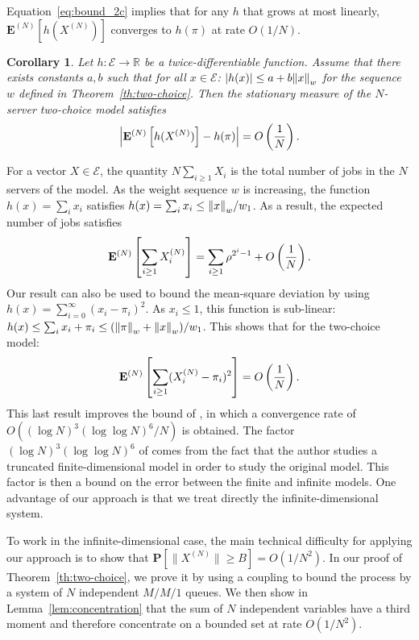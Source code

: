 \documentclass[sigconf]{acmart}
\newcommand\XN{X^{(N)}}
\newcommand\E{\mathcal{E}}
\newcommand\R{\mathbb{R}}
\newcommand\espN[1]{{\mathchoice{\bespN{#1}}{\sespN{#1}}{\sespN{#1}}{\sespN{#1}}}}
\newcommand\bespN[1]{\mathbf{E}^{(N)}\left[#1\right]}
\newcommand\sespN[1]{\mathbf{E}^{(N)}[#1]}
\newcommand\sProba[1]{\mathbf{P}[#1]}
\newcommand\norm[1]{{\mathchoice{\bnorm{#1}}{\snorm{#1}}{\snorm{#1}}{\snorm{#1}}}}
\newcommand\bnorm[1]{\left\|#1\right\|}
\newcommand\snorm[1]{\|#1\|}
\newcommand\abs[1]{\left|#1\right|}
\newcommand\p[1]{\left(#1\right)}
\newtheorem{coro}{Corollary}
\begin{document}
Equation~\eqref{eq:bound_2c} implies that for any $h$ that grows at
most linearly, $\sespN{h(\XN)}$ converges to $h(\pi)$ at rate
$O(1/N)$.
\begin{coro}
  \label{coro:two-choice}
  Let $h:\E\to\R$ be a twice-differentiable function. Assume that
  there exists constants $a,b$ such that for all $x\in\E$:
  $|h(x)|\le a+b\norm{x}_w$ for the sequence $w$ defined in
  Theorem~\ref{th:two-choice}. Then the stationary measure of the
  $N$-server two-choice model satisfies
  \begin{align*}
    \abs{\espN{h(\XN)}-h(\pi)}=O\p{\frac1N}.
  \end{align*}
\end{coro}
For a vector $X\in\E$, the quantity
$N\sum_{i\ge 1}X_i$ is the total number of jobs in the $N$ servers of
the model. As the weight sequence $w$ is increasing, the function
$h(x)=\sum_ix_i$ satisfies $h(x)=\sum_ix_i\le \norm{x}_w/w_1$. As a
result, the expected number of jobs satisfies
\begin{align}
  \label{eq:avg_2c}
  \espN{\sum_{i\ge1}\XN_i} 
  = \sum_{i\ge1} \rho^{2^i-1} +
  O\p{\frac1N}.
\end{align}
Our result can also be used to bound the mean-square deviation by
using $h(x)=\sum_{i=0}^\infty(x_i-\pi_i)^2$. As $x_i\le1$, this
function is sub-linear:
$h(x)\le \sum_ix_i+\pi_i \le (\norm{\pi}_w + \norm{x}_w)/w_1$. This
shows that for the two-choice model:
\begin{align*}
  \espN{\sum_{i\ge1}(\XN_i-\pi_i)^2} = O\p{\frac1N}. 
\end{align*}
This last result improves the bound of \cite{ying2016twochoice}, in
which a convergence rate of $O((\log N)^3(\log\log N)^6 /N)$ is
obtained. The factor $(\log N)^3(\log\log N)^6$ of
\cite{ying2016twochoice} comes from the fact that the author studies a
truncated finite-dimensional model in order to study the original
model.  This factor is then a bound on the error between the finite
and infinite models.  One advantage of our approach is that we treat
directly the infinite-dimensional system.


To work in the infinite-dimensional case, the main technical
difficulty for applying our approach is to show that
$\sProba{\snorm{\XN}\ge B}=O(1/N^2)$. In our proof of
Theorem~\ref{th:two-choice}, we prove it by using a coupling to bound
the process by a system of $N$ independent $M/M/1$ queues. We then
show in Lemma~\ref{lem:concentration} that the sum of $N$ independent
variables have a third moment and therefore concentrate on a bounded
set at rate $O(1/N^2)$.  
\end{document}
